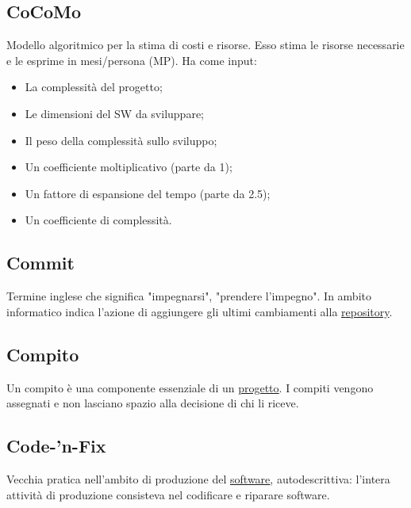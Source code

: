 	\subsection{CoCoMo}
	\label{sec:cocomo}
	Modello algoritmico per la stima di costi e risorse. Esso stima le risorse necessarie e le esprime in mesi/persona (MP). Ha come input:
	\begin{itemize}  
	\item La complessità del progetto;
	\item Le dimensioni del SW da sviluppare;
	\item Il peso della complessità sullo sviluppo;
	\item Un coefficiente moltiplicativo (parte da 1);
	\item Un fattore di espansione del tempo (parte da 2.5);
	\item Un coefficiente di complessità.
	\end{itemize}	

	\subsection{Commit}
	\label{sec:commit}
    Termine inglese che significa "impegnarsi", "prendere l'impegno". In ambito informatico indica l'azione di aggiungere gli ultimi cambiamenti alla \underline{\hyperref[sec:repo]repository{}}.

	\subsection{Compito}
	\label{sec:compiti}
	Un compito è una componente essenziale di un \underline{\hyperref[sec:progetto]{progetto}}. I compiti vengono assegnati e non lasciano spazio alla decisione di chi li riceve.	

	\subsection{Code-'n-Fix}
	\label{sec:codenfix}
	Vecchia pratica nell'ambito di produzione del \underline{\hyperref[sec:prodottosoftware]{software}}, autodescrittiva: l'intera attività di produzione consisteva nel codificare e riparare software.

